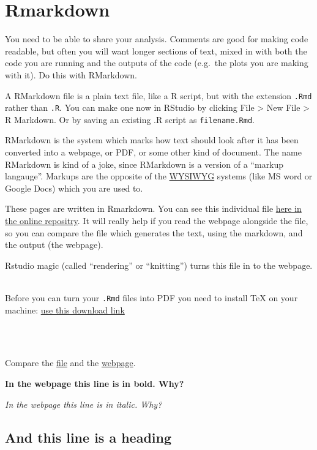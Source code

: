 \documentclass[
]{book}
\newenvironment{info}
    {
    \hline\\
    }
    { 
    \\\\\hline
    }
\begin{document}
\hypertarget{rmarkdown}{%
\chapter{Rmarkdown}\label{rmarkdown}}

You need to be able to share your analysis. Comments are good for making code readable, but often you will want longer sections of text, mixed in with both the code you are running and the outputs of the code (e.g.~the plots you are making with it). Do this with RMarkdown.

A RMarkdown file is a plain text file, like a R script, but with the extension \texttt{.Rmd} rather than \texttt{.R}. You can make one now in RStudio by clicking File \textgreater{} New File \textgreater{} R Markdown. Or by saving an existing .R script as \texttt{filename.Rmd}.

RMarkdown is the system which marks how text should look after it has been converted into a webpage, or PDF, or some other kind of document. The name RMarkdown is kind of a joke, since RMarkdown is a version of a ``markup langauge''. Markups are the opposite of the \href{https://en.wikipedia.org/wiki/WYSIWYG}{WYSIWYG} systems (like MS word or Google Docs) which you are used to.

These pages are written in Rmarkdown. You can see this individual file \href{https://github.com/tomstafford/psy6422/blob/master/070-rmarkdown.Rmd}{here in the online repositry}. It will really help if you read the webpage alongside the file, so you can compare the file which generates the text, using the markdown, and the output (the webpage).

Rstudio magic (called ``rendering'' or ``knitting'') turns this file in to the webpage.

\begin{info}
Before you can turn your \texttt{.Rmd} files into PDF you need to
install TeX on your machine: \href{https://miktex.org/download}{use this
download link}
\end{info}

Compare the \href{https://github.com/tomstafford/psy6422/blob/master/070-rmarkdown.Rmd}{file} and the \href{https://tomstafford.github.io/psy6422/rmarkdown.html}{webpage}.

\textbf{In the webpage this line is in bold. Why?}

\emph{In the webpage this line is in italic. Why?}

\hypertarget{and-this-line-is-a-heading}{%
\section{And this line is a heading}\label{and-this-line-is-a-heading}}
\end{document}
